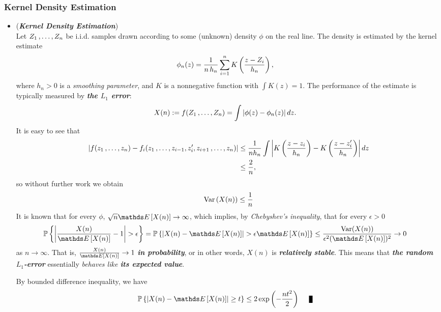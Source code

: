 \documentclass[11pt]{article}
\begin{document}
\subsubsection{Kernel Density Estimation}
\begin{itemize}
\item \begin{example} (\emph{\textbf{Kernel Density Estimation}})\\
Let $Z_1 \,{,}\ldots{,}\, Z_n$ be i.i.d. samples drawn according to some (unknown) density $\phi$ on the real line. The density is estimated by the kernel estimate
\begin{align*}
\phi_n(z) &=\frac{1}{n\, h_n} \sum_{i=1}^{n}K\left(\frac{z - Z_i}{h_n}\right),
\end{align*} where $h_n > 0$ is a \emph{smoothing parameter}, and $K$ is a nonnegative function with $\int K(z) = 1$. The performance of the estimate is typically measured by \emph{\textbf{the $L_1$ error}}:
\begin{align*}
X(n) &:= f(Z_1 \,{,}\ldots{,}\, Z_n) = \int \left\lvert \phi(z) - \phi_n(z) \right\rvert d z.
\end{align*} It is easy to see that
\begin{align*}
\left\lvert f(z_1 \,{,}\ldots{,}\, z_n) - f_i(z_1 \,{,}\ldots{,}\, z_{i-1}, z_i', z_{i+1} \,{,}\ldots{,}\, z_n) \right\rvert &\le \frac{1}{n h_n}\int \left\lvert K\left(\frac{z - z_i}{h_n}\right) - K\left(\frac{z - z_i'}{h_n}\right) \right\rvert d z\\
&\le \frac{2}{n},
\end{align*} so without further work we obtain
\begin{align*}
\text{Var}\left(X(n)\right) \le \frac{1}{n}
\end{align*}
It is known that for every $\phi$, $\sqrt{n} \E{}{X(n)} \to \infty$, which implies, by \emph{Chebyshev's inequality}, that for every $\epsilon > 0$
\begin{align*}
\bP\set{\abs{\frac{X(n)}{\E{}{X(n)}} - 1} > \epsilon} = \bP\set{\abs{X(n) -\E{}{X(n)}} > \epsilon \E{}{X(n)} } &\le \frac{\text{Var}(X(n))}{\epsilon^2 (\E{}{X(n)})^2}  \to 0
\end{align*} as $n \to \infty$. That is, $\frac{X(n)}{\E{}{X(n)}} \to 1$ \emph{\textbf{in probability}}, or in other words, $X(n)$ is \emph{\textbf{relatively stable}}. This means that \emph{\textbf{the random $L_1$-error}} essentially \emph{behaves like \textbf{its expected value}}.

By bounded difference inequality, we have
\begin{align*}
\bP\set{\abs{X(n) - \E{}{X(n)}} \ge t} &\le 2 \exp\paren{- \frac{n t^2}{2}}  \qed
\end{align*}
\end{example}
\end{itemize}
\end{document}
